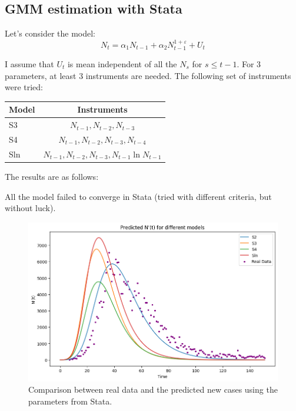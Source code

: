 \subsection{GMM estimation with Stata}

    Let's consider the model:
    \begin{equation}
        N_{t} = \alpha_1 N_{t-1} + \alpha_2 N_{t-1}^{1 + \varepsilon} + U_t
        \label{eq:equation1}
    \end{equation}

    I assume that $U_t$ is mean independent of all the $N_s$ for $s\leq t-1$.
    For 3 parameters, at least 3 instruments are needed.
    The following set of instruments were tried:
    \begin{table}[h!]
        \centering
        \begin{tabular}{l c}
            Model & Instruments \\ \hline
            S3 & $N_{t-1}, N_{t-2}, N_{t-3}$ \\
            S4 &  $N_{t-1}, N_{t-2}, N_{t-3}, N_{t-4}$ \\
            Sln &  $N_{t-1}, N_{t-2}, N_{t-3}, N_{t-1} \ln N_{t-1}$
        \end{tabular}
        \label{tab:models_stat}
    \end{table}

    The results are as follows:
    

    All the model failed to converge in Stata (tried with different criteria, but without luck).
    \begin{figure}[h!]
        \centering
        \includegraphics[width=0.8\linewidth]{plots/gmm_stata}
        \caption{Comparison between real data and the predicted new cases using the parameters from Stata.}
        \label{fig:plot_gmm_stata}
    \end{figure}

